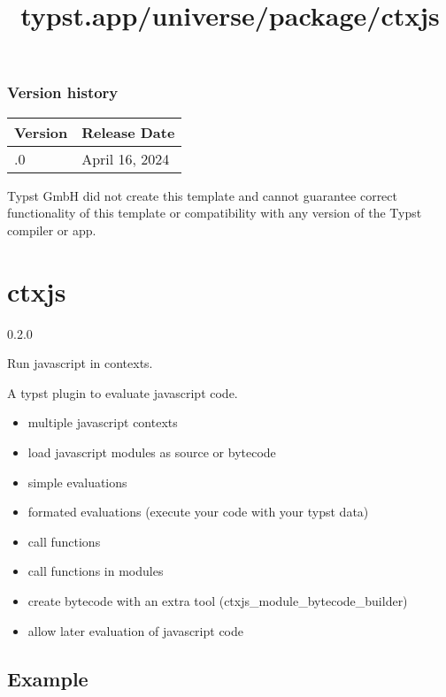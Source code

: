 \label{versions}
\subsubsection{Version history}\label{version-history}

\begin{longtable}[]{@{}ll@{}}
\toprule\noalign{}
Version & Release Date \\
\midrule\noalign{}
\endhead
\bottomrule\noalign{}
\endlastfoot
0.1.0 & April 16, 2024 \\
\end{longtable}

Typst GmbH did not create this template and cannot guarantee correct
functionality of this template or compatibility with any version of the
Typst compiler or app.


\title{typst.app/universe/package/ctxjs}

\label{banner}
\section{ctxjs}\label{ctxjs}

{ 0.2.0 }

Run javascript in contexts.

\label{readme}
A typst plugin to evaluate javascript code.

\begin{itemize}
\tightlist
\item
  multiple javascript contexts
\item
  load javascript modules as source or bytecode
\item
  simple evaluations
\item
  formated evaluations (execute your code with your typst data)
\item
  call functions
\item
  call functions in modules
\item
  create bytecode with an extra tool (ctxjs\_module\_bytecode\_builder)
\item
  allow later evaluation of javascript code
\end{itemize}

\subsection{Example}\label{example}

